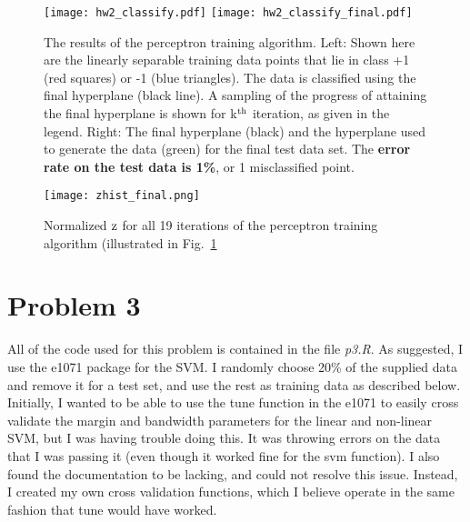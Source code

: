 \documentclass[12pt]{article}%
\begin{document}
\begin{figure}[tb]
\center
\texttt{[image: hw2\_classify.pdf]}
\texttt{[image: hw2\_classify\_final.pdf]}
\caption{The results of the perceptron training algorithm. Left: Shown here are the linearly separable training data points that lie in class +1 (red squares) or -1 (blue triangles). The data is classified using the final hyperplane (black line). A sampling of the progress of attaining the final hyperplane is shown for k$^{\rm{th}}$ iteration, as given in the legend. Right: The final hyperplane (black) and the hyperplane used to generate the data (green) for the final test data set. The \textbf{error rate on the test data is 1\%}, or 1 misclassified point.}
\label{fig:classify}
\end{figure}

\begin{figure}[tb]
\center
\texttt{[image: zhist\_final.png]}
\caption{Normalized $\rm{z}$ for all 19 iterations of the perceptron training algorithm (illustrated in Fig.~\ref{fig:classify}}
\label{fig:zhist}
\end{figure}

\section{Problem 3}
All of the code used for this problem is contained in the file \textit{p3.R}. As suggested, I use the e1071 package for the SVM. I randomly choose 20\% of the supplied data and remove it for a test set, and use the rest as training data as described below. Initially, I wanted to be able to use the tune function in the e1071 to easily cross validate the margin and bandwidth parameters for the linear and non-linear SVM, but I was having trouble doing this. It was throwing errors on the data that I was passing it (even though it worked fine for the svm function). I also found the documentation to be lacking, and could not resolve this issue. Instead, I created my own cross validation functions, which I believe operate in the same fashion that tune would have worked. 
\end{document}
